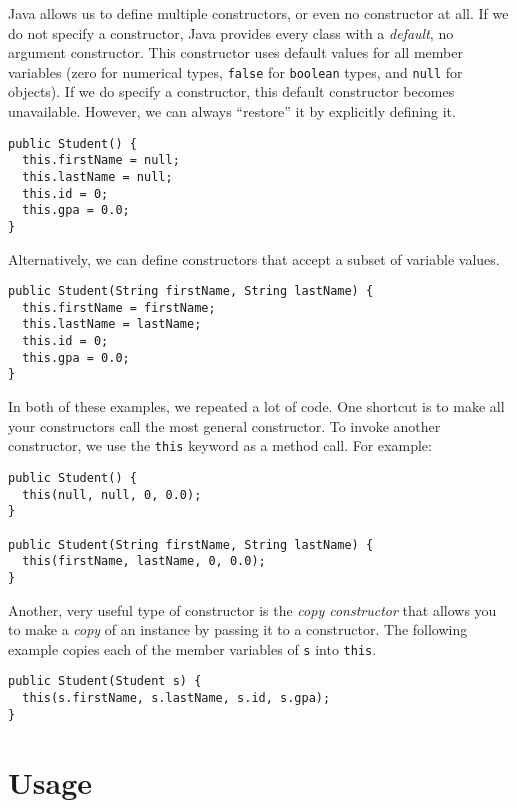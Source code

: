 Java allows us to define multiple constructors, or even no constructor
at all.  If we do not specify a constructor, Java provides every 
class with a \emph{default}, no argument constructor.  This 
constructor uses default values for all member variables (zero
for numerical types, \texttt{false} for \texttt{boolean}
types, and \texttt{null} for objects).  If we do specify
a constructor, this default constructor becomes unavailable.  However,
we can always ``restore'' it by explicitly defining it.

\begin{verbatim}
public Student() {
  this.firstName = null;
  this.lastName = null;
  this.id = 0;
  this.gpa = 0.0;
}
\end{verbatim}

Alternatively, we can define constructors that accept a subset of 
variable values.

\begin{verbatim}
public Student(String firstName, String lastName) {
  this.firstName = firstName;
  this.lastName = lastName;
  this.id = 0;
  this.gpa = 0.0;
}
\end{verbatim}

In both of these examples, we repeated a lot of code.  One shortcut
is to make all your constructors call the most general constructor.
To invoke another constructor, we use the \texttt{this}
keyword as a method call.  For example:

\begin{verbatim}
public Student() {
  this(null, null, 0, 0.0);
}

public Student(String firstName, String lastName) {
  this(firstName, lastName, 0, 0.0);
}
\end{verbatim}

Another, very useful type of constructor is the \emph{copy constructor}
that allows you to make a \emph{copy} of an instance by passing
it to a constructor.  The following example copies each of the
member variables of \texttt{s} into \texttt{this}.

\begin{verbatim}
public Student(Student s) {
  this(s.firstName, s.lastName, s.id, s.gpa);
}
\end{verbatim}

\section{Usage}

